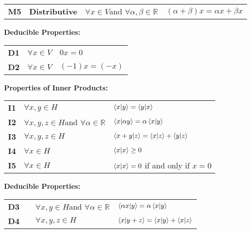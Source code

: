\documentclass[12pt]{article}
\begin{document}
\begin{table}
\begin{center}
\begin{tabular}{llll}
  {\bf M5} & {\bf Distributive} & $\forall x \in V$and $\forall \alpha,\beta \in \mathbb{R}$ & $ (\alpha + \beta)x = \alpha x + \beta x $ \\
\end{tabular}
\vskip 0.5cm
{\bf Deducible Properties:}\\
\begin{tabular}{lll}
{\bf D1}  & $\forall x \in V $  & $0x = 0$ \\
{\bf D2}  & $\forall x \in V $  & $(-1)x = (-x)$ \\
\end{tabular}
\vskip 0.5cm
{\bf Properties of Inner Products:}\\
\begin{tabular}{lll}
  {\bf I1} & $\forall x,y \in H$ & $\braket{x|y} = \braket{y|x}$\\
{\bf I2} & $\forall x,y,z \in H$and $\forall \alpha \in \mathbb{R}$ &
$\braket{x|\alpha y} = \alpha \braket{x|y}$\\
{\bf I3} & $\forall x,y,z \in H$ & $\braket{x+y|z} = \braket{x|z}+\braket{y|z}$\\
{\bf I4} & $\forall x \in H$ & $\braket{x|x} \geq 0$ \\
{\bf I5} & $\forall x \in H$ & $\braket{x|x}=0$ if and only if $x=0$ \\
\end{tabular}
\vskip 0.5cm
{\bf Deducible Properties:}\\
\begin{tabular}{llll}
{\bf D3} & & $\forall x,y \in H$and $\forall \alpha \in \mathbb{R}$ &
$\braket{\alpha x|y} = \alpha \braket{x|y}$\\
{\bf D4} & & $\forall x,y,z \in H$ &
$\braket{x|y+z} = \braket{x|y}+\braket{x|z}$\\
\end{tabular}
\end{center}
\end{table}

\newpage



       
\end{document}
